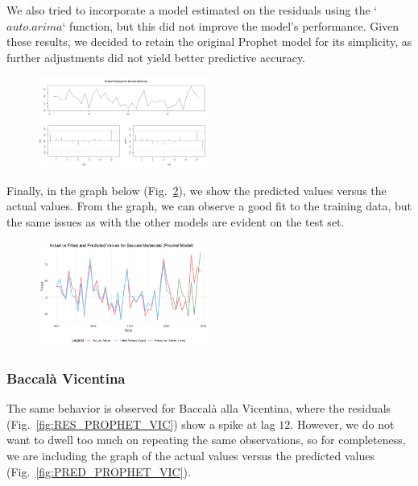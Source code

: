 \documentclass[10pt,twocolumn,letterpaper]{article}
\begin{document}
We also tried to incorporate a model estimated on the residuals using the `$auto.arima$` function, but this did not improve the model's performance. Given these results, we decided to retain the original Prophet model for its simplicity, as further adjustments did not yield better predictive accuracy.

\begin{figure}[H]
    \centering
    \includegraphics[width=0.5\textwidth]{PlotsBEFD/RES_PROPHET_MAN.png} 
    \caption{}
    \label{fig:RES_PROPHET_MAN}
\end{figure}

Finally, in the graph below (Fig.~\ref{fig:PRED_PROPHET_MAN}), we show the predicted values versus the actual values. From the graph, we can observe a good fit to the training data, but the same issues as with the other models are evident on the test set.
\begin{figure}[H]
    \centering
    \includegraphics[width=0.5\textwidth]{PlotsBEFD/PRED_PROPHET_MAN.png} 
    \caption{}
    \label{fig:PRED_PROPHET_MAN}
\end{figure}

\subsubsection{Baccalà Vicentina}
The same behavior is observed for Baccalà alla Vicentina, where the residuals (Fig.~\ref{fig:RES_PROPHET_VIC}) show a spike at lag $12$. However, we do not want to dwell too much on repeating the same observations, so for completeness, we are including the graph of the actual values versus the predicted values (Fig.~\ref{fig:PRED_PROPHET_VIC}). 

\end{document}

